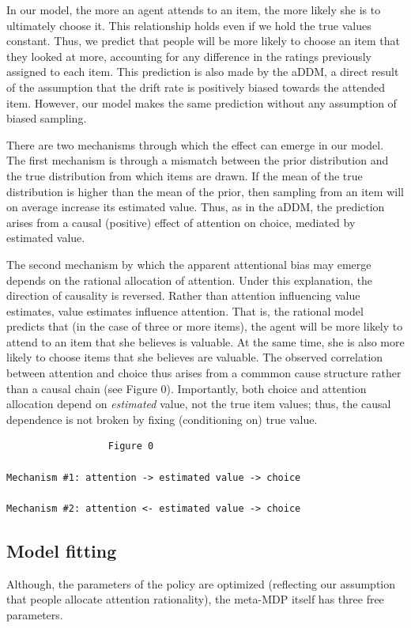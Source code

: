 \documentclass[12pt,a4paperpaper,]{article}
\begin{document}
In our model, the more an agent attends to an item, the more likely she is to ultimately choose it. This relationship holds even if we hold the true values constant. Thus, we predict that people will be more likely to choose an item that they looked at more, accounting for any difference in the ratings previously assigned to each item. This prediction is also made by the aDDM, a direct result of the assumption that the drift rate is positively biased towards the attended item. However, our model makes the same prediction without any assumption of biased sampling.

There are two mechanisms through which the effect can emerge in our model. The first mechanism is through a mismatch between the prior distribution and the true distribution from which items are drawn. If the mean of the true distribution is higher than the mean of the prior, then sampling from an item will on average increase its estimated value. Thus, as in the aDDM, the prediction arises from a causal (positive) effect of attention on choice, mediated by estimated value.

The second mechanism by which the apparent attentional bias may emerge depends on the rational allocation of attention. Under this explanation, the direction of causality is reversed. Rather than attention influencing value estimates, value estimates influence attention. That is, the rational model predicts that (in the case of three or more items), the agent will be more likely to attend to an item that she believes is valuable. At the same time, she is also more likely to choose items that she believes are valuable. The observed correlation between attention and choice thus arises from a commmon cause structure rather than a causal chain (see Figure 0). Importantly, both choice and attention allocation depend on \emph{estimated} value, not the true item values; thus, the causal dependence is not broken by fixing (conditioning on) true value.

\begin{verbatim}
                  Figure 0

Mechanism #1: attention -> estimated value -> choice

Mechanism #2: attention <- estimated value -> choice
\end{verbatim}


\subsection{Model fitting}
Although, the parameters of the policy are optimized (reflecting our assumption that people allocate attention rationality), the meta-MDP itself has three free parameters.
\end{document}
